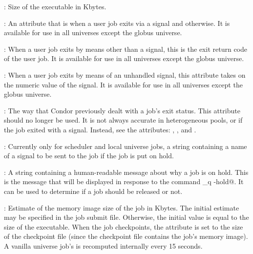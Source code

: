 \begin{description}
\item[\AdAttr{ExecutableSize}] : Size of the executable in Kbytes.

\item[\AdAttr{ExitBySignal}] : An attribute that is 
when a user job exits via a signal and  otherwise.
It is available for use 
in all universes except the globus universe.

\item[\AdAttr{ExitCode}] : When a user job exits by means other than a signal,
this is the exit return code of the user job.
It is available for use 
in all universes except the globus universe.

\item[\AdAttr{ExitSignal}] : When a user job exits by means of an unhandled 
signal, this attribute takes on the numeric value of the signal.
It is available for use 
in all universes except the globus universe.

\item[\AdAttr{ExitStatus}] : The way that Condor previously dealt with
a job's exit status.
This attribute should no longer be used.
It is not always accurate in
heterogeneous pools, or if the job exited with a signal.
Instead, see the attributes: ,
, and
.

\item[\AdAttr{HoldKillSig}] :   Currently only for scheduler and local
universe jobs,
a string containing a name of
a signal to be sent to the job if the job is put on hold.

\item[\AdAttr{HoldReason}] :   A string containing a human-readable
message about why a job is on hold.
This is the message that will be displayed in response to
the command \verb@condor_q -hold@.
It can be used to determine if a job should be released or not.

\item[\AdAttr{ImageSize}] : Estimate of the memory image size of the
job in Kbytes.  The initial estimate may be specified in the job
submit file.  Otherwise, the initial value is equal to the size of the
executable.  When the job checkpoints, the 
attribute is set to the size of the checkpoint file (since the
checkpoint file contains the job's memory image).
A vanilla universe job's  is recomputed
internally every 15 seconds.


\end{description}
